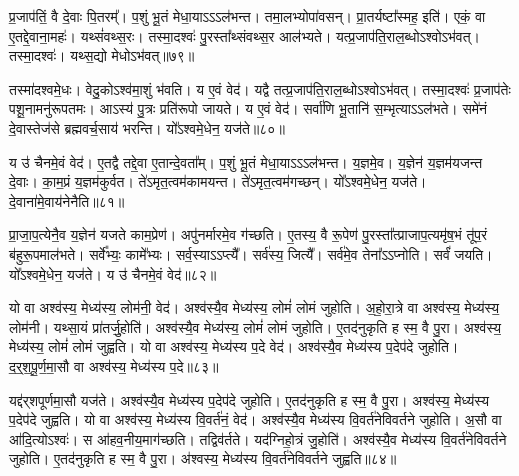 प्र॒जा\-प॑तिं॒ वै दे॒वाः पि॒तरम्᳚।
प॒शुं भू॒तं मेधा॒याऽऽऽल॑भन्त।
तमा॒लभ्योपा॑वसन्।
प्रा॒तर्यष्टा᳚स्मह॒ इति॑।
एकं॒ वा ए॒तद्दे॒वाना॒महः॑।
यथ्सं॑वथ्स॒रः।
तस्मा॒दश्वः॑ पु॒रस्ता᳚थ्संवथ्स॒र आल॑भ्यते।
यत्प्र॒जा\-प॑ति॒\-रा\-ल॒ब्धो\-ऽश्वो\-ऽभ॑वत्।
तस्मा॒दश्वः॑।
यथ्स॒द्यो मेधो\-ऽभ॑वत्॥७९॥\ip

तस्मा॑दश्वमे॒धः।
वेदु॒को\-ऽश्व॑मा॒शुं भ॑वति।
य ए॒वं वेद॑।
यद्वै तत्प्र॒जा\-प॑ति॒राल॒ब्धो\-ऽश्वो\-ऽभ॑वत्।
तस्मा॒दश्वः॑ प्र॒जा\-प॑तेः पशू॒नामनु॑रूपतमः।
आऽस्य॑ पु॒त्रः प्रति॑\-रूपो जायते।
य ए॒वं वेद॑।
सर्वा॑णि भू॒तानि॑ स॒म्भृत्याऽऽल॑भते।
समे॑नं दे॒वास्तेज॑से ब्रह्मवर्च॒साय॑ भरन्ति।
यो᳚ऽश्वमे॒धेन॒ यज॑ते॥८०॥\ip

य उ॑ चैनमे॒वं वेद॑।
ए॒तद्वै तद्दे॒वा ए॒तान्दे॒वता᳚म्।
प॒शुं भू॒तं मेधा॒याऽऽऽल॑भन्त।
य॒ज्ञमे॒व।
य॒ज्ञेन॑ य॒ज्ञम॑यजन्त दे॒वाः।
का॒म॒प्रं य॒ज्ञम॑कुर्वत।
ते॑ऽमृत॒त्वम॑कामयन्त।
ते॑ऽमृत॒त्वम॑गच्छन्।
यो᳚ऽश्वमे॒धेन॒ यज॑ते।
दे॒वाना॑मे॒वाय॑नेनैति॥८१॥\ip

प्रा॒जा॒प॒त्येनै॒व य॒ज्ञेन॑ यजते काम॒प्रेण॑।
अपु॑नर्मारमे॒व ग॑च्छति।
ए॒तस्य॒ वै रू॒पेण॑ पु॒रस्ता᳚त्प्राजाप॒त्यमृ॑ष॒भं तू॑प॒रं ब॑हुरू॒पमाल॑भते।
सर्वे᳚भ्यः॒ कामे᳚भ्यः।
सर्व॒स्याऽऽप्त्यै᳚।
सर्व॑स्य॒ जित्यै᳚।
सर्व॑मे॒व तेना᳚\-ऽऽ\-प्नोति।
सर्वं॑ जयति।
यो᳚ऽश्वमे॒धेन॒ यज॑ते।
य उ॑ चैनमे॒वं वेद॑॥८२॥\ip\anuvakamend[मेधो\-ऽभ॑व॒द्यज॑त एति॒ वेद॑]

यो वा अश्व॑स्य॒ मेध्य॑स्य॒ लोम॑नी॒ वेद॑।
अश्व॑स्यै॒व मेध्य॑स्य॒ लोमं॑ लोमं जुहोति।
अ॒हो॒रा॒त्रे वा अश्व॑स्य॒ मेध्य॑स्य॒ लोम॑नी।
यथ्सा॒यं प्रा॑तर्जु॒होति॑।
अश्व॑स्यै॒व मेध्य॑स्य॒ लोमं॑ लोमं जुहोति।
ए॒तद॑नुकृति ह स्म॒ वै पु॒रा।
अश्व॑स्य॒ मेध्य॑स्य॒ लोमं॑ लोमं जुह्वति।
यो वा अश्व॑स्य॒ मेध्य॑स्य प॒दे वेद॑।
अश्व॑स्यै॒व मेध्य॑स्य प॒देप॑दे जुहोति।
द॒र्॒श॒पू॒र्ण॒मा॒सौ वा अश्व॑स्य॒ मेध्य॑स्य प॒दे॥८३॥\ip

यद्द॑र्‌\mbox{}शपूर्णमा॒सौ यज॑ते।
अश्व॑स्यै॒व मेध्य॑स्य प॒देप॑दे जुहोति।
ए॒तद॑नुकृति ह स्म॒ वै पु॒रा।
अश्व॑स्य॒ मेध्य॑स्य प॒देप॑दे जुह्वति।
यो वा अश्व॑स्य॒ मेध्य॑स्य वि॒वर्त॑नं॒ वेद॑।
अश्व॑स्यै॒व मेध्य॑स्य वि॒वर्त॑नेविवर्तने जुहोति।
अ॒सौ वा आ॑दि॒त्यो\-ऽश्वः॑।
स आ॑हव॒नीय॒माग॑च्छति।
तद्विव॑र्तते।
यद॑ग्निहो॒त्रं जु॒होति॑।
अश्व॑स्यै॒व मेध्य॑स्य वि॒वर्त॑नेविवर्तने जुहोति।
ए॒तद॑नुकृति ह स्म॒ वै पु॒रा।
अ॑श्वस्य॒ मेध्य॑स्य वि॒वर्त॑नेविवर्तने जुह्वति॥८४॥\ip\anuvakamend[प॒दे अ॑ग्निहो॒त्रं जु॒होति॒ त्रीणि॑ च]

\clearpage
